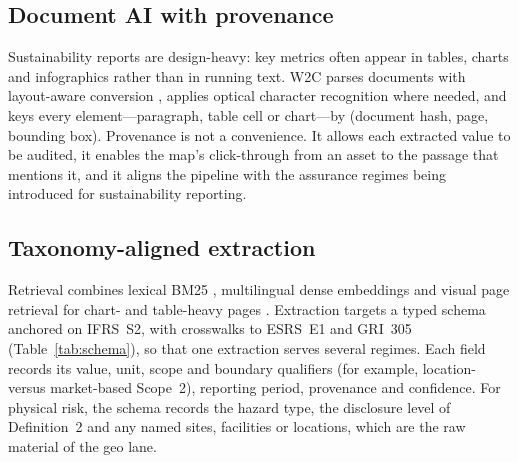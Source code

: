 \documentclass{article}
\theoremstyle{plain}
\theoremstyle{definition}
\begin{document}
\subsection{Document AI with provenance}
Sustainability reports are design-heavy: key metrics often appear in tables, charts and infographics rather than in running text. W2C parses documents with layout-aware conversion \citep{auer2024docling}, applies optical character recognition where needed, and keys every element---paragraph, table cell or chart---by (document hash, page, bounding box). Provenance is not a convenience. It allows each extracted value to be audited, it enables the map's click-through from an asset to the passage that mentions it, and it aligns the pipeline with the assurance regimes being introduced for sustainability reporting.

\subsection{Taxonomy-aligned extraction}
Retrieval combines lexical BM25 \citep{robertson2009bm25}, multilingual dense embeddings \citep{chen2024bgem3} and visual page retrieval for chart- and table-heavy pages \citep{faysse2024colpali}. Extraction targets a typed schema anchored on IFRS~S2, with crosswalks to ESRS~E1 and GRI~305 (Table~\ref{tab:schema}), so that one extraction serves several regimes. Each field records its value, unit, scope and boundary qualifiers (for example, location- versus market-based Scope~2), reporting period, provenance and confidence. For physical risk, the schema records the hazard type, the disclosure level of Definition~2 and any named sites, facilities or locations, which are the raw material of the geo lane.
\end{document}
